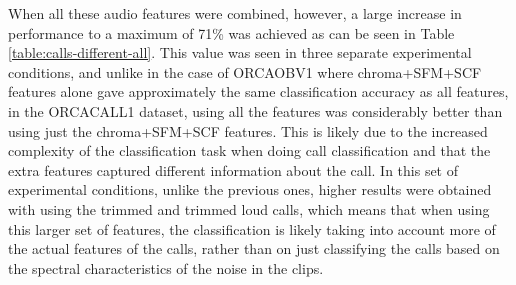 When all these audio features were combined, however, a large increase
in performance to a maximum of 71\% was achieved as can be seen in
Table \ref{table:calls-different-all}.  This value was seen in three
separate experimental conditions, and unlike in the case of ORCAOBV1
where chroma+SFM+SCF features alone gave approximately the same
classification accuracy as all features, in the ORCACALL1 dataset,
using all the features was considerably better than using just the
chroma+SFM+SCF features.  This is likely due to the increased
complexity of the classification task when doing call classification
and that the extra features captured different information about the
call.  In this set of experimental conditions, unlike the previous
ones, higher results were obtained with using the trimmed and trimmed
loud calls, which means that when using this larger set of features,
the classification is likely taking into account more of the actual
features of the calls, rather than on just classifying the calls based
on the spectral characteristics of the noise in the clips.

